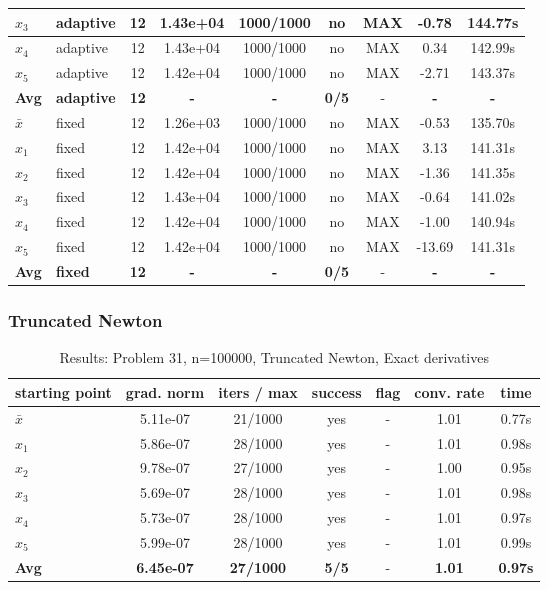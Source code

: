 \begin{longtable}{|l|l|c|c|c|c|c|c|c|}
\hline
$x_3$ & adaptive & 12 & 1.43e+04 & 1000/1000 & no & MAX & -0.78 & 144.77s \\
\hline
$x_4$ & adaptive & 12 & 1.43e+04 & 1000/1000 & no & MAX & 0.34 & 142.99s \\
\hline
$x_5$ & adaptive & 12 & 1.42e+04 & 1000/1000 & no & MAX & -2.71 & 143.37s \\
\hline
\hline\hline
\textbf{Avg} & \textbf{adaptive} & \textbf{12} & \textbf{-} & \textbf{-} & \textbf{0/5} & - & \textbf{-} & \textbf{-} \\
\hline\hline
\hline
$\bar{x}$ & fixed & 12 & 1.26e+03 & 1000/1000 & no & MAX & -0.53 & 135.70s \\
\hline
$x_1$ & fixed & 12 & 1.42e+04 & 1000/1000 & no & MAX & 3.13 & 141.31s \\
\hline
$x_2$ & fixed & 12 & 1.42e+04 & 1000/1000 & no & MAX & -1.36 & 141.35s \\
\hline
$x_3$ & fixed & 12 & 1.43e+04 & 1000/1000 & no & MAX & -0.64 & 141.02s \\
\hline
$x_4$ & fixed & 12 & 1.42e+04 & 1000/1000 & no & MAX & -1.00 & 140.94s \\
\hline
$x_5$ & fixed & 12 & 1.42e+04 & 1000/1000 & no & MAX & -13.69 & 141.31s \\
\hline
\hline\hline
\textbf{Avg} & \textbf{fixed} & \textbf{12} & \textbf{-} & \textbf{-} & \textbf{0/5} & - & \textbf{-} & \textbf{-} \\
\hline\hline
\end{longtable}


\subsubsection{Truncated Newton}

\begin{longtable}{|l|c|c|c|c|c|c|}
\caption{Results: Problem 31, n=100000, Truncated Newton, Exact derivatives} \\
\hline
\textbf{starting point} & \textbf{grad. norm} & \textbf{iters / max} & \textbf{success} & \textbf{flag} & \textbf{conv. rate} & \textbf{time} \\
\hline
\endfirsthead
\endhead
\endfoot
\hline
\endlastfoot
$\bar{x}$ & 5.11e-07 & 21/1000 & yes & - & 1.01 & 0.77s \\
\hline
$x_1$ & 5.86e-07 & 28/1000 & yes & - & 1.01 & 0.98s \\
\hline
$x_2$ & 9.78e-07 & 27/1000 & yes & - & 1.00 & 0.95s \\
\hline
$x_3$ & 5.69e-07 & 28/1000 & yes & - & 1.01 & 0.98s \\
\hline
$x_4$ & 5.73e-07 & 28/1000 & yes & - & 1.01 & 0.97s \\
\hline
$x_5$ & 5.99e-07 & 28/1000 & yes & - & 1.01 & 0.99s \\
\hline
\hline\hline
\textbf{Avg} & \textbf{6.45e-07} & \textbf{27/1000} & \textbf{5/5} & - & \textbf{1.01} & \textbf{0.97s} \\
\hline\hline
\end{longtable}


